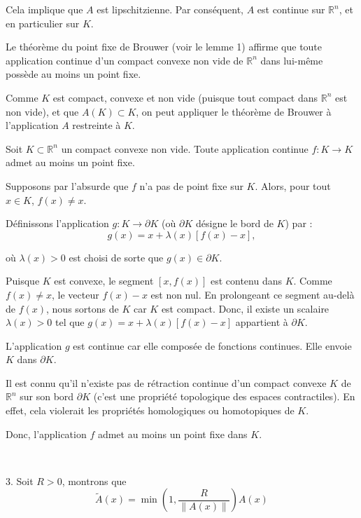 Cela implique que $A$ est lipschitzienne. Par cons{\'e}quent, $A$ est continue
sur $\mathbb{R}^n$, et en particulier sur $K$.

Le th{\'e}or{\`e}me du point fixe de Brouwer (voir le lemme 1) affirme que
toute application continue d'un compact convexe non vide de $\mathbb{R}^n$
dans lui-m{\^e}me poss{\`e}de au moins un point fixe.

Comme $K$ est compact, convexe et non vide (puisque tout compact dans
$\mathbb{R}^n$ est non vide), et que $A (K) \subset K$, on peut appliquer le
th{\'e}or{\`e}me de Brouwer {\`a} l'application $A$ restreinte {\`a} $K$.


Soit $K \subset \mathbb{R}^n$ un compact convexe non vide. Toute application
continue $f : K \rightarrow K$ admet au moins un point fixe.


Supposons par l'absurde que $f$ n'a pas de point fixe sur $K$. Alors, pour
tout $x \in K$, $f (x) \neq x$.

D{\'e}finissons l'application $g : K \rightarrow \partial K$ (o{\`u} $\partial
K$ d{\'e}signe le bord de $K$) par :
\[ g (x) = x + \lambda (x) [f (x) - x], \]


o{\`u} $\lambda (x) > 0$ est choisi de sorte que $g (x) \in \partial K$.

Puisque $K$ est convexe, le segment $[x, f (x)]$ est contenu dans $K$. Comme
$f (x) \neq x$, le vecteur $f (x) - x$ est non nul. En prolongeant ce segment
au-del{\`a} de $f (x)$, nous sortons de $K$ car $K$ est compact. Donc, il
existe un scalaire $\lambda (x) > 0$ tel que $g (x) = x + \lambda (x) [f (x) -
x]$ appartient {\`a} $\partial K$.

L'application $g$ est continue car elle compos{\'e}e de fonctions continues.
Elle envoie $K$ dans $\partial K$.

Il est connu qu'il n'existe pas de r{\'e}traction continue d'un compact
convexe $K$ de $\mathbb{R}^n$ sur son bord $\partial K$ (c'est une
propri{\'e}t{\'e} topologique des espaces contractiles). En effet, cela
violerait les propri{\'e}t{\'e}s homologiques ou homotopiques de $K$.

Donc, l'application $f$ admet au moins un point fixe dans $K$.

\

3. Soit $R > 0$, montrons que
\[ \tilde{A} (x) = \min \left( 1, \dfrac{R}{\|A (x)\|} \right) A (x) \]



